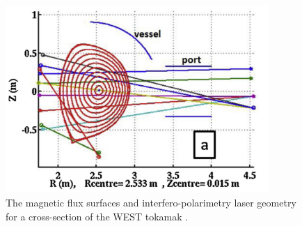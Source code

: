 \begin{figure}
  \centering
  \includegraphics[width=10cm]{images/magfluxsurf.png}
  \caption{The magnetic flux surfaces and interfero-polarimetry laser geometry for a cross-section of the WEST tokamak \cite{reneintpol}.}
  \label{fig:magfluxsurf}
\end{figure}

